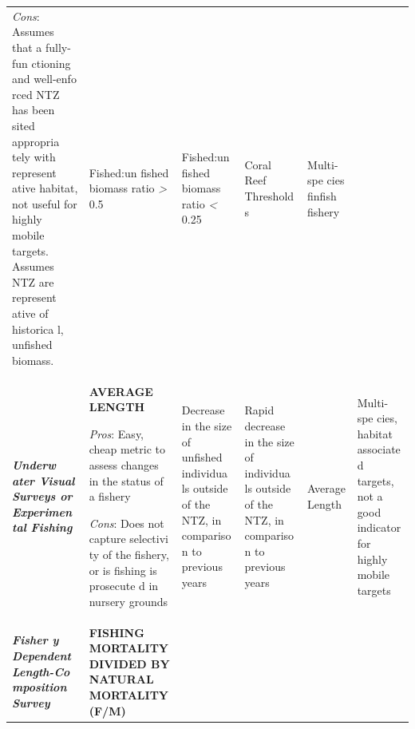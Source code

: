 \documentclass[]{book}
\begin{document}
\begin{longtable}[]{@{}llllll@{}}
\begin{minipage}[t]{0.16\columnwidth}
\emph{Cons}: Assumes that a fully-fun ctioning and well-enfo rced NTZ
has been sited appropria tely with represent ative habitat, not useful
for highly mobile targets. Assumes NTZ are represent ative of historica
l, unfished biomass.\strut
\end{minipage} & \begin{minipage}[t]{0.16\columnwidth}\raggedright\strut
Fished:un fished biomass ratio \emph{\textgreater{}} 0.5\strut
\end{minipage} & \begin{minipage}[t]{0.16\columnwidth}\raggedright\strut
Fished:un fished biomass ratio \emph{\textless{}} 0.25\strut
\end{minipage} & \begin{minipage}[t]{0.16\columnwidth}\raggedright\strut
Coral Reef Threshold s\strut
\end{minipage} & \begin{minipage}[t]{0.16\columnwidth}\raggedright\strut
Multi-spe cies finfish fishery\strut
\end{minipage}\tabularnewline
\begin{minipage}[t]{0.16\columnwidth}\raggedright\strut
\emph{\textbf{Underw ater Visual Surveys or Experimen tal Fishing}
}\strut
\end{minipage} & \begin{minipage}[t]{0.16\columnwidth}\raggedright\strut
\textbf{AVERAGE LENGTH}

\emph{Pros}: Easy, cheap metric to assess changes in the status of a
fishery

\emph{Cons}: Does not capture selectivi ty of the fishery, or is fishing
is prosecute d in nursery grounds\strut
\end{minipage} & \begin{minipage}[t]{0.16\columnwidth}\raggedright\strut
Decrease in the size of unfished individua ls outside of the NTZ, in
compariso n to previous years\strut
\end{minipage} & \begin{minipage}[t]{0.16\columnwidth}\raggedright\strut
Rapid decrease in the size of individua ls outside of the NTZ, in
compariso n to previous years\strut
\end{minipage} & \begin{minipage}[t]{0.16\columnwidth}\raggedright\strut
Average Length\strut
\end{minipage} & \begin{minipage}[t]{0.16\columnwidth}\raggedright\strut
Multi-spe cies, habitat associate d targets, not a good indicator for
highly mobile targets\strut
\end{minipage}\tabularnewline
\begin{minipage}[t]{0.16\columnwidth}\raggedright\strut
\textbf{\emph{Fisher y Dependent Length-Co mposition Survey}}\strut
\end{minipage} & \begin{minipage}[t]{0.16\columnwidth}\raggedright\strut
\textbf{FISHING MORTALITY DIVIDED BY NATURAL MORTALITY (F/M)}


\end{minipage}
\end{longtable}
\end{document}
